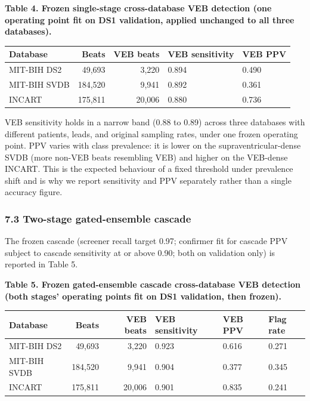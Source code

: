 \documentclass[
]{article}
\begin{document}
\textbf{Table 4. Frozen single-stage cross-database VEB detection (one
operating point fit on DS1 validation, applied unchanged to all three
databases).}

\begin{longtable}[]{@{}lrrll@{}}
\toprule\noalign{}
Database & Beats & VEB beats & VEB sensitivity & VEB PPV \\
\midrule\noalign{}
\endhead
\bottomrule\noalign{}
\endlastfoot
MIT-BIH DS2 & 49,693 & 3,220 & 0.894 & 0.490 \\
MIT-BIH SVDB & 184,520 & 9,941 & 0.892 & 0.361 \\
INCART & 175,811 & 20,006 & 0.880 & 0.736 \\
\end{longtable}

VEB sensitivity holds in a narrow band (0.88 to 0.89) across three
databases with different patients, leads, and original sampling rates,
under one frozen operating point. PPV varies with class prevalence: it
is lower on the supraventricular-dense SVDB (more non-VEB beats
resembling VEB) and higher on the VEB-dense INCART. This is the expected
behaviour of a fixed threshold under prevalence shift and is why we
report sensitivity and PPV separately rather than a single accuracy
figure.

\subsubsection{7.3 Two-stage gated-ensemble
cascade}\label{two-stage-gated-ensemble-cascade-1}

The frozen cascade (screener recall target 0.97; confirmer fit for
cascade PPV subject to cascade sensitivity at or above 0.90; both on
validation only) is reported in Table 5.

\textbf{Table 5. Frozen gated-ensemble cascade cross-database VEB
detection (both stages' operating points fit on DS1 validation, then
frozen).}

\begin{longtable}[]{@{}lrrlll@{}}
\toprule\noalign{}
Database & Beats & VEB beats & VEB sensitivity & VEB PPV & Flag rate \\
\midrule\noalign{}
\endhead
\bottomrule\noalign{}
\endlastfoot
MIT-BIH DS2 & 49,693 & 3,220 & 0.923 & 0.616 & 0.271 \\
MIT-BIH SVDB & 184,520 & 9,941 & 0.904 & 0.377 & 0.345 \\
INCART & 175,811 & 20,006 & 0.901 & 0.835 & 0.241 \\
\end{longtable}
\end{document}
